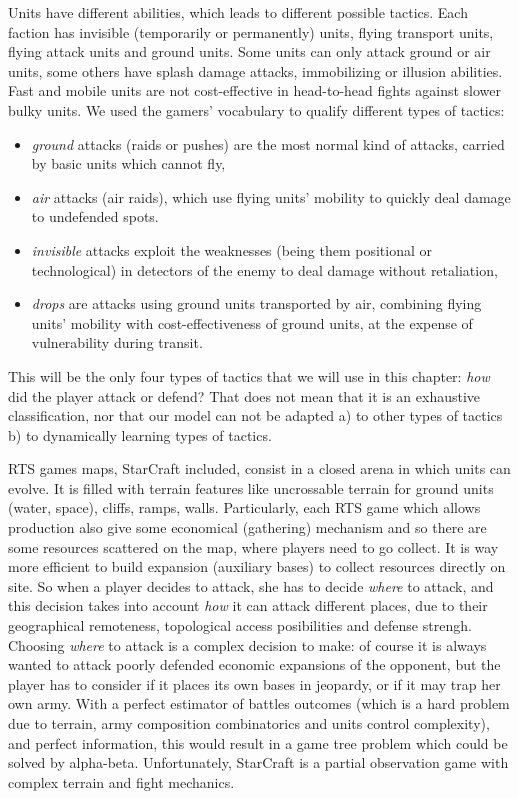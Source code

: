 Units have different abilities, which leads to different possible tactics. Each faction has invisible (temporarily or permanently) units, flying transport units, flying attack units and ground units. Some units can only attack ground or air units, some others have splash damage attacks, immobilizing or illusion abilities. Fast and mobile units are not cost-effective in head-to-head fights against slower bulky units. We used the gamers' vocabulary to qualify different types of tactics: 
\begin{itemize}
    \item \textit{ground} attacks (raids or pushes) are the most normal kind of attacks, carried by basic units which cannot fly,
    \item \textit{air} attacks (air raids), which use flying units' mobility to quickly deal damage to undefended spots.
    \item \textit{invisible} attacks exploit the weaknesses (being them positional or technological) in detectors of the enemy to deal damage without retaliation,
    \item \textit{drops} are attacks using ground units transported by air, combining flying units' mobility with cost-effectiveness of ground units, at the expense of vulnerability during transit.
\end{itemize}
This will be the only four types of tactics that we will use in this chapter: \textit{how} did the player attack or defend? That does not mean that it is an exhaustive classification, nor that our model can not be adapted a) to other types of tactics b) to dynamically learning types of tactics.

RTS games maps, StarCraft included, consist in a closed arena in which units can evolve. It is filled with terrain features like uncrossable terrain for ground units (water, space), cliffs, ramps, walls. Particularly, each RTS game which allows production also give some economical (gathering) mechanism and so there are some resources scattered on the map, where players need to go collect. It is way more efficient to build expansion (auxiliary bases) to collect resources directly on site. So when a player decides to attack, she has to decide \textit{where} to attack, and this decision takes into account \textit{how} it can attack different places, due to their geographical remoteness, topological access posibilities and defense strengh. Choosing \textit{where} to attack is a complex decision to make: of course it is always wanted to attack poorly defended economic expansions of the opponent, but the player has to consider if it places its own bases in jeopardy, or if it may trap her own army. With a perfect estimator of battles outcomes (which is a hard problem due to terrain, army composition combinatorics and units control complexity), and perfect information, this would result in a game tree problem which could be solved by alpha-beta. Unfortunately, StarCraft is a partial observation game with complex terrain and fight mechanics.

